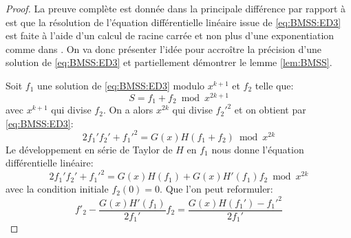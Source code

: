 \documentclass[10pt,a4paper]{book}
\theoremstyle{plain}
\theoremstyle{definition}
\theoremstyle{definition}
\theoremstyle{definition}
\theoremstyle{definition}
\theoremstyle{remark}
\theoremstyle{remark}
\theoremstyle{definition}
\begin{document}
\begin{proof}
La preuve complète est donnée dans \cite{Lercier-Sirvent2008} la principale différence par rapport à \cite{BMSS08} est que la résolution de l'équation différentielle linéaire issue de \eqref{eq:BMSS:ED3} est faite à l'aide d'un calcul de racine carrée et non plus d'une exponentiation comme dans \cite{BMSS08}. 
On va donc présenter l'idée pour accroître la précision d'une solution de \eqref{eq:BMSS:ED3} et partiellement démontrer le lemme \ref{lem:BMSS}.

Soit $f_1$ une solution de \eqref{eq:BMSS:ED3} modulo $x^{k+1}$ et $f_2$ telle que:
\begin{equation}
S=f_1+f_2 \bmod x^{2k+1}
\end{equation}
avec $x^{k+1}$ qui divise $f_2$. On a alors $x^{2k}$ qui divise $f_2'^2$ et on obtient par \eqref{eq:BMSS:ED3}:
\begin{equation}
\label{eq:BMSS:ED4}
2f_1'f_2'+f_1'^2=G(x)H(f_1+f_2) \bmod x^{2k}
\end{equation}
Le développement en série de Taylor de $H$ en $f_1$ nous donne l'équation différentielle linéaire:
\begin{equation}
2f_1'f_2'+f_1'^2=G(x)H(f_1)+G(x)H'(f_1)f_2 \bmod x^{2k}
\end{equation}
avec la condition initiale $f_2(0)=0$. Que l'on peut reformuler:
\begin{equation}
\label{eq:LS08:diflin}
f'_2-\frac{G(x)H'(f_1)}{2f_1'}f_2=\frac{G(x)H(f_1')-f_1'^2}{2f_1'}
\end{equation}


\end{proof}
\end{document}
